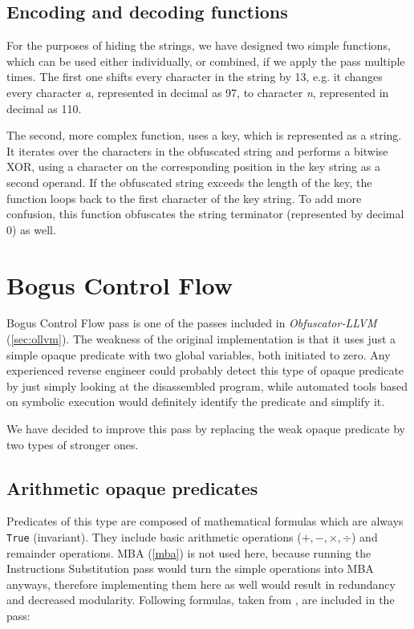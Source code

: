 \documentclass[
  digital, %
  notable,   %
  twoside, %
  nolof,     %
  nolot,     %
]{fithesis3}
\theoremstyle{definition}
\begin{document}
\subsection{Encoding and decoding functions}
For the purposes of hiding the strings, we have designed two simple functions, which can be used either individually, or combined, if we apply the pass multiple times. The first one shifts every character in the string by 13, e.g. it changes every character \textit{a}, represented in decimal as 97, to character \textit{n}, represented in decimal as 110.

The second, more complex function, uses a key, which is represented as a string. It iterates over the characters in the obfuscated string and performs a bitwise XOR, using a character on the corresponding position in the key string as a second operand. If the obfuscated string exceeds the length of the key, the function loops back to the first character of the key string. To add more confusion, this function obfuscates the string terminator (represented by decimal 0) as well.

\section{Bogus Control Flow} \label{des_bogus}

Bogus Control Flow pass is one of the passes included in \textit{Obfuscator-LLVM} (\ref{sec:ollvm}). The weakness of the original implementation is that it uses just a simple opaque predicate with two global variables, both initiated to zero. Any experienced reverse engineer could probably detect this type of opaque predicate by just simply looking at the disassembled program, while automated tools based on symbolic execution would definitely identify the predicate and simplify it. 

We have decided to improve this pass by replacing the weak opaque predicate by two types of stronger ones.

\subsection{Arithmetic opaque predicates}
Predicates of this type are composed of mathematical formulas which are always \texttt{True} (invariant). They include basic arithmetic operations ($+, -, \times, \div$) and remainder operations. MBA (\ref{mba}) is not used here, because running the Instructions Substitution pass would turn the simple operations into MBA anyways, therefore implementing them here as well would result in redundancy and decreased modularity. Following formulas, taken from \cite{loop}, are included in the pass:
\end{document}
